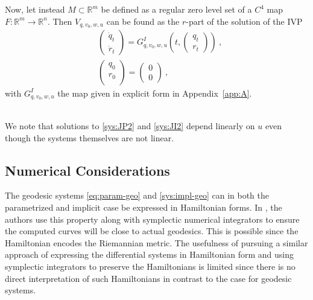 \documentclass[final]{svjour3}
\newcommand{\RR}{\mathbb{R}}
\begin{document}
\begin{em}
    Now, let instead $M\subset\RR^m$ be defined as a regular zero
    level set of a $C^4$ map $F:\RR^m\rightarrow\RR^n$.
    Then $V_{q,v_0,w,u}$ can be found as the $r$-part of the solution of the IVP
    \begin{equation}
        \begin{split}
            &
            \begin{pmatrix}
                \dot{q}_t\\
                \dot{r}_t
            \end{pmatrix}
            =
            G_{q,v_0,w,u}^I\left(t,
            \begin{pmatrix}
                q_t\\
                r_t
            \end{pmatrix}
            \right)
            \ ,\\
            &
            \begin{pmatrix}
                q_0\\
                r_0\\
            \end{pmatrix}
            =
            \begin{pmatrix}
                0\\
                0
            \end{pmatrix}
            \ ,
        \end{split}
        \label{sys:JI2}
    \end{equation}
    with $G_{q,v_0,w,u}^I$ the map given in explicit form in Appendix~\ref{app:A}.
\end{em}\vspace{0.5em}\\
We note that solutions to \eqref{sys:JP2} and \eqref{sys:JI2} depend linearly on $u$ even
though the systems themselves are not linear.

\subsection{Numerical Considerations}
The geodesic systems \eqref{eq:param-geo} and \eqref{sys:impl-geo} can in both 
the parametrized and implicit case be expressed
in Hamiltonian forms. In \cite{dedieu_symplectic_2005}, the authors use this
property along with symplectic numerical integrators to ensure 
the computed curves will be close to actual geodesics. This is possible since the Hamiltonian encodes
the Riemannian metric. The usefulness of pursuing a similar approach of 
expressing the differential systems in
Hamiltonian form and using symplectic integrators to preserve the Hamiltonians
is limited since there is no
direct interpretation of such Hamiltonians in contrast to the case for 
geodesic systems.
\end{document}
